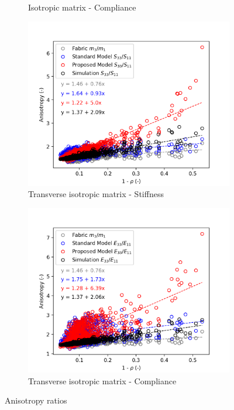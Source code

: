 \documentclass[a4paper,fleqn]{DC_ArtStyle}
\begin{document}
\begin{figure}
\begin{subfigure}[b]{0.45\linewidth}
			\caption{Isotropic matrix - Compliance}
		\end{subfigure}
		\begin{subfigure}[b]{0.45\linewidth}
			\includegraphics[width=\linewidth]{Anisotropy_STransverse}
			\caption{Transverse isotropic matrix - Stiffness}
		\end{subfigure}
		\begin{subfigure}[b]{0.45\linewidth}
			\includegraphics[width=\linewidth]{Anisotropy_ETransverse}
			\caption{Transverse isotropic matrix - Compliance}
		\end{subfigure}
		\caption{Anisotropy ratios}
	\end{figure}
\end{document}

